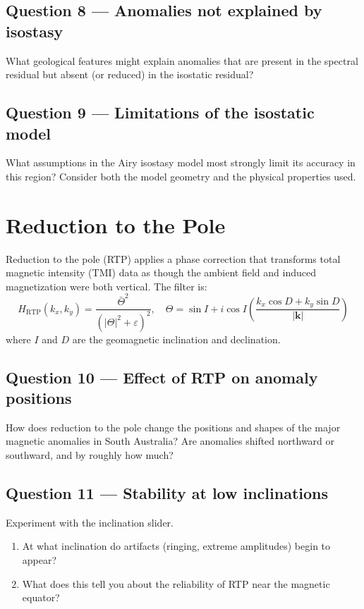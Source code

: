 \documentclass[11pt]{article}
\begin{document}
\subsection*{Question 8 — Anomalies not explained by isostasy}

What geological features might explain anomalies that are present in the spectral
residual but absent (or reduced) in the isostatic residual?

\subsection*{Question 9 — Limitations of the isostatic model}

What assumptions in the Airy isostasy model most strongly limit its accuracy in
this region?  Consider both the model geometry and the physical properties used.

\section{Reduction to the Pole}

Reduction to the pole (RTP) applies a phase correction that transforms total
magnetic intensity (TMI) data as though the ambient field and induced
magnetization were both vertical.  The filter is:
\[
  H_\mathrm{RTP}(k_x, k_y) =
    \frac{\bar{\Theta}^2}{\left(|\Theta|^2 + \varepsilon\right)^2},
  \quad
  \Theta = \sin I +
    i\cos I\!\left(\frac{k_x \cos D + k_y \sin D}{|\mathbf{k}|}\right)
\]
where $I$ and $D$ are the geomagnetic inclination and declination.

\subsection*{Question 10 — Effect of RTP on anomaly positions}

How does reduction to the pole change the positions and shapes of the major
magnetic anomalies in South Australia?  Are anomalies shifted northward or
southward, and by roughly how much?

\subsection*{Question 11 — Stability at low inclinations}

Experiment with the inclination slider.
\begin{enumerate}[label=\alph*.]
  \item At what inclination do artifacts (ringing, extreme amplitudes) begin to
        appear?
  \item What does this tell you about the reliability of RTP near the magnetic
        equator?
\end{enumerate}
\end{document}
